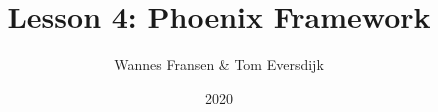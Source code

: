 \documentclass{beamer}
\title{Lesson 4: Phoenix Framework}
\author{Wannes Fransen \& Tom Eversdijk}
\institute{UC Leuven}
\date{2020}
\begin{document}
\frame{\titlepage}






\end{document}
